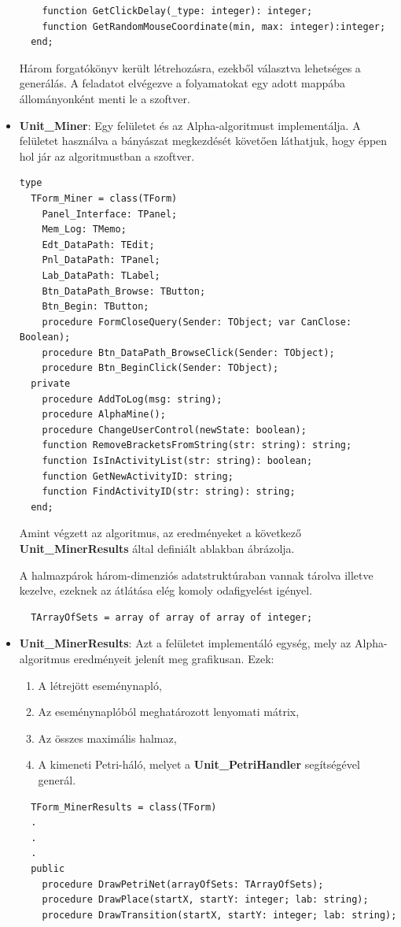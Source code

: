 \begin{itemize}
{\begin{lstlisting}
    function GetClickDelay(_type: integer): integer;
    function GetRandomMouseCoordinate(min, max: integer):integer;
  end;

	\end{lstlisting}

		Három forgatókönyv került létrehozásra, ezekből választva lehetséges a generálás. A feladatot elvégezve a folyamatokat egy adott mappába állományonként menti le a szoftver.
	}
	\item{
		\textbf{Unit\_Miner}: Egy felületet és az Alpha-algoritmust implementálja. A felületet használva a bányászat megkezdését követően láthatjuk, hogy éppen hol jár az algoritmustban a szoftver.
	\begin{lstlisting}
type
  TForm_Miner = class(TForm)
    Panel_Interface: TPanel;
    Mem_Log: TMemo;
    Edt_DataPath: TEdit;
    Pnl_DataPath: TPanel;
    Lab_DataPath: TLabel;
    Btn_DataPath_Browse: TButton;
    Btn_Begin: TButton;
    procedure FormCloseQuery(Sender: TObject; var CanClose: Boolean);
    procedure Btn_DataPath_BrowseClick(Sender: TObject);
    procedure Btn_BeginClick(Sender: TObject);
  private
    procedure AddToLog(msg: string);
    procedure AlphaMine();
    procedure ChangeUserControl(newState: boolean);
    function RemoveBracketsFromString(str: string): string;
    function IsInActivityList(str: string): boolean;
    function GetNewActivityID: string;
    function FindActivityID(str: string): string;
  end;
	\end{lstlisting}

Amint végzett az algoritmus, az eredményeket a következő \textbf{Unit\_MinerResults} által definiált ablakban ábrázolja.

A halmazpárok három-dimenziós adatstruktúraban vannak tárolva illetve kezelve, ezeknek az átlátása elég komoly odafigyelést igényel.
	\begin{lstlisting}
  TArrayOfSets = array of array of array of integer;
	\end{lstlisting}

	}
	\item{
		\textbf{Unit\_MinerResults}: Azt a felületet implementáló egység, mely az Alpha-algoritmus eredményeit jelenít meg grafikusan. Ezek:
		\begin{enumerate}
			\item{A létrejött eseménynapló,}
			\item{Az eseménynaplóból meghatározott lenyomati mátrix,}
			\item{Az összes maximális halmaz,}
			\item{A kimeneti Petri-háló, melyet a \textbf{Unit\_PetriHandler} segítségével generál.}
		\end{enumerate}
		\begin{lstlisting}
  TForm_MinerResults = class(TForm)
  .
  .
  .
  public
    procedure DrawPetriNet(arrayOfSets: TArrayOfSets);
    procedure DrawPlace(startX, startY: integer; lab: string);
    procedure DrawTransition(startX, startY: integer; lab: string);


\end{lstlisting}}
\end{itemize}
